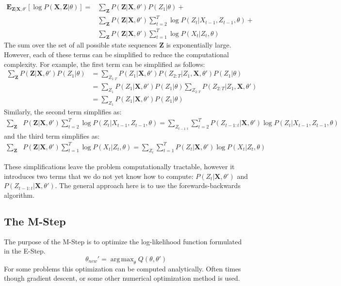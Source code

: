 \documentclass{amsart}
\theoremstyle{definition}
\theoremstyle{remark}
\numberwithin{equation}{section}
\DeclareMathOperator*{\argmax}{arg\,max}
\begin{document}
\begin{align*}
\textbf{E}_{\textbf{Z}|\textbf{X},\theta'} \left[\log{P(\textbf{X},\textbf{Z}|\theta)}\right] = &\sum_\textbf{Z} P(\textbf{Z}|\textbf{X},\theta')P(Z_1|\theta) + \\
&\sum_\textbf{Z} P(\textbf{Z}|\textbf{X},\theta')\sum_{t=2}^T \log P(Z_t|X_{t-1}, Z_{t-1},\theta) + \\
&\sum_\textbf{Z} P(\textbf{Z}|\textbf{X},\theta')\sum_{t=1}^T \log P(X_t|Z_t,\theta)
\end{align*}
The sum over the set of all possible state sequences $\textbf{Z}$ is exponentially large. However, each of these terms can be simplified to reduce the computational complexity. For example, the first term can be simplified as follows:
\begin{align*}
\sum_\textbf{Z} P(\textbf{Z}|\textbf{X},\theta')P(Z_1|\theta) &= \sum_{Z_{1:T}} P(Z_1|\textbf{X},\theta')P(Z_{2:T}|Z_1,\textbf{X},\theta')P(Z_1|\theta)\\
&= \sum_{Z_1} P(Z_1|\textbf{X},\theta')P(Z_1|\theta)\sum_{Z_{2:T}} P(Z_{2:T}|Z_1,\textbf{X},\theta')\\
&= \sum_{Z_1} P(Z_1|\textbf{X},\theta')P(Z_1|\theta)
\end{align*}
Similarly, the second term simplifies as:
\begin{align*}
\sum_\textbf{Z}& P(\textbf{Z}|\textbf{X},\theta')\sum_{t=2}^T \log P(Z_t|X_{t-1}, Z_{t-1},\theta) = \sum_{Z_{t-1:t}}\sum_{t=2}^T P(Z_{t-1:t}|\textbf{X},\theta') \log P(Z_t|X_{t-1}, Z_{t-1},\theta)
\end{align*}
and the third term simplifies as:
\begin{align*}
\sum_\textbf{Z}& P(\textbf{Z}|\textbf{X},\theta')\sum_{t=1}^T \log P(X_t|Z_t,\theta) = \sum_{Z_t}\sum_{t=1}^T P(Z_t|\textbf{X},\theta') \log P(X_t|Z_t,\theta)
\end{align*}

These simplifications leave the problem computationally tractable, however it introduces two terms that we do not yet know how to compute: $P(Z_t|\textbf{X},\theta')$ and $P(Z_{t-1:t}|\textbf{X},\theta')$. The general approach here is to use the forewards-backwards algorithm.

\subsection*{The M-Step}
The purpose of the M-Step is to optimize the log-likelihood function formulated in the E-Step.
\[
\theta_{new}' = \argmax_\theta Q(\theta,\theta')
\]
For some problems this optimization can be computed analytically. Often times though gradient descent, or some other numerical optimization method is used.
\end{document}
